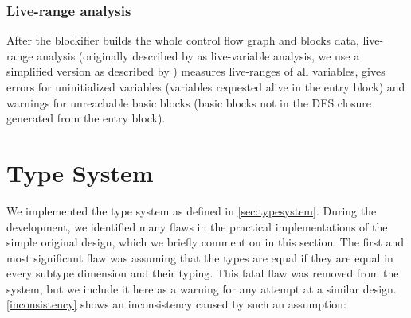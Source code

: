 \subsubsection{Live-range analysis}


After the blockifier builds the whole control flow graph and blocks data, live-range analysis (originally described by \citet{Aho2006compilers} as live-variable analysis, we use a simplified version as described by \citet{bednarek2008compilers}) measures live-ranges of all variables, gives errors for uninitialized variables (variables requested alive in the entry block) and warnings for unreachable basic blocks (basic blocks not in the DFS closure generated from the entry block).


\section{Type System}

We implemented the type system as defined in \cref{sec:typesystem}. During the development, we identified many flaws in the practical implementations of the simple original design, which we briefly comment on in this section. The first and most significant flaw was assuming that the types are equal if they are equal in every subtype dimension and their typing. This fatal flaw was removed from the system, but we include it here as a warning for any attempt at a similar design. \cref{inconsistency} shows an inconsistency caused by such an assumption:

